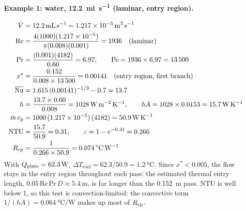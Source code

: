 \paragraph{Example 1: water, \SI{12.2}{\milli\litre\per\second} (laminar, entry
region).}
\begin{align*}
  \dot{V} &= \SI{12.2}{\milli\litre\per\second} = \SI{1.217e-5}{\metre\cubed\per\second}\\
  \mathrm{Re} &= \frac{4(1000)(1.217\times10^{-5})}{\pi(0.008)(0.001)} = 1936
    \quad\text{(laminar)}\\
  \mathrm{Pr} &= \frac{(0.001)(4182)}{0.60} = 6.97,
    \qquad \mathrm{Pe} = 1936 \times 6.97 = \num{13500}\\
  x^* &= \frac{0.152}{0.008 \times \num{13500}} = 0.00141
    \quad\text{(entry region, first branch)}\\
  \overline{\mathrm{Nu}} &= 1.615\,(0.00141)^{-1/3} - 0.7 = 13.7\\
  h &= \frac{13.7 \times 0.60}{0.008} = \SI{1028}{\watt\per\metre\squared\per\kelvin},
    \qquad hA = 1028 \times 0.0153 = \SI{15.7}{\watt\per\kelvin}\\
  \dot{m}\,c_{\mathrm{p}} &= 1000\,(1.217\times10^{-5})\,(4182) = \SI{50.9}{\watt\per\kelvin}\\
  \mathrm{NTU} &= \frac{15.7}{50.9} = 0.31,
    \qquad \varepsilon = 1 - e^{-0.31} = 0.266\\
  R_{\mathrm{cp}} &= \frac{1}{0.266 \times 50.9} = \SI{0.074}{\celsius\per\watt}
\end{align*}
With $Q_{\mathrm{plate}} = \SI{62.3}{\watt}$, $\Delta T_{\mathrm{cool}} =
62.3/50.9 = \SI{1.2}{\celsius}$. Since $x^* < 0.005$, the flow stays in the
entry region throughout each pass: the estimated thermal entry length,
$0.05\,\mathrm{Re}\,\mathrm{Pr}\,D \approx \SI{5.4}{\metre}$, is far longer than
the \SI{0.152}{\metre} pass. NTU is well below 1, so this test is
convection-limited: the convective term $1/(hA) = \SI{0.064}{\celsius\per\watt}$
makes up most of $R_{\mathrm{cp}}$.

